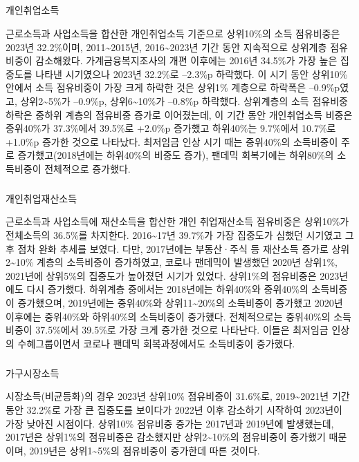 \documentclass[
  letterpaper,
  DIV=11,
  numbers=noendperiod]{scrartcl}
\makeatletter
\let\oldsubparagraph\subparagraph
\renewcommand{\subparagraph}{
    \@ifstar
      \xxxSubParagraphStar
      \xxxSubParagraphNoStar
  }
\newcommand{\xxxSubParagraphStar}[1]{\oldsubparagraph*{#1}\mbox{}}
\newcommand{\xxxSubParagraphNoStar}[1]{\oldsubparagraph{#1}\mbox{}}
\makeatother
\begin{document}
\subparagraph{개인취업소득}\label{uxac1cuxc778uxcde8uxc5c5uxc18cuxb4dd}

근로소득과 사업소득을 합산한 개인취업소득 기준으로 상위10\%의 소득
점유비중은 2023년 32.2\%이며, 2011\textasciitilde2015년,
2016\textasciitilde2023년 기간 동안 지속적으로 상위계층 점유비중이
감소해왔다. 가계금융복지조사의 개편 이후에는 2016년 34.5\%가 가장 높은
집중도를 나타낸 시기였으나 2023년 32.2\%로 --2.3\%p 하락했다. 이 시기
동안 상위10\% 안에서 소득 점유비중이 가장 크게 하락한 것은 상위1\%
계층으로 하락폭은 --0.9\%p였고, 상위2\textasciitilde5\%가 --0.9\%p,
상위6\textasciitilde10\%가 --0.8\%p 하락했다. 상위계층의 소득 점유비중
하락은 중하위 계층의 점유비중 증가로 이어졌는데, 이 기간 동안
개인취업소득 비중은 중위40\%가 37.3\%에서 39.5\%로 +2.0\%p 증가했고
하위40\%는 9.7\%에서 10.7\%로 +1.0\%p 증가한 것으로 나타났다. 최저임금
인상 시기 때는 중위40\%의 소득비중이 주로 증가했고(2018년에는 하위40\%의
비중도 증가), 팬데믹 회복기에는 하위80\%의 소득비중이 전체적으로
증가했다.

\subparagraph{개인취업재산소득}\label{uxac1cuxc778uxcde8uxc5c5uxc7acuxc0b0uxc18cuxb4dd}

근로소득과 사업소득에 재산소득을 합산한 개인 취업재산소득 점유비중은
상위10\%가 전체소득의 36.5\%를 차지한다. 2016\textasciitilde17년
39.7\%가 가장 집중도가 심했던 시기였고 그 후 점차 완화 추세를 보였다.
다만, 2017년에는 부동산·주식 등 재산소득 증가로 상위2\textasciitilde10\%
계층의 소득비중이 증가하였고, 코로나 팬데믹이 발생했던 2020년 상위1\%,
2021년에 상위5\%의 집중도가 높아졌던 시기가 있었다. 상위1\%의 점유비중은
2023년에도 다시 증가했다. 하위계층 중에서는 2018년에는 하위40\%와
중위40\%의 소득비중이 증가했으며, 2019년에는 중위40\%와
상위11\textasciitilde20\%의 소득비중이 증가했고 2020년 이후에는
중위40\%와 하위40\%의 소득비중이 증가했다. 전체적으로는 중위40\%의
소득비중이 37.5\%에서 39.5\%로 가장 크게 증가한 것으로 나타난다. 이들은
최저임금 인상의 수혜그룹이면서 코로나 팬데믹 회복과정에서도 소득비중이
증가했다.

\subparagraph{가구시장소득}\label{uxac00uxad6cuxc2dcuxc7a5uxc18cuxb4dd}

시장소득(비균등화)의 경우 2023년 상위10\% 점유비중이 31.6\%로,
2019\textasciitilde2021년 기간 동안 32.2\%로 가장 큰 집중도를 보이다가
2022년 이후 감소하기 시작하여 2023년이 가장 낮아진 시점이다. 상위10\%
점유비중 증가는 2017년과 2019년에 발생했는데, 2017년은 상위1\%의
점유비중은 감소했지만 상위2\textasciitilde10\%의 점유비중이 증가했기
때문이며, 2019년은 상위1\textasciitilde5\%의 점유비중이 증가한데 따른
것이다.
\end{document}
